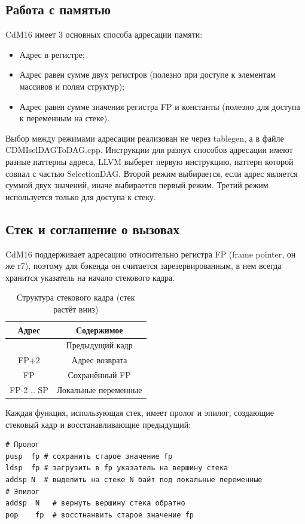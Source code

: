 \documentclass[a4paper,14pt]{extarticle}
\begin{document}
\subsection{Работа с памятью}
CdM16 имеет 3 основных способа адресации памяти:
\begin{itemize}
	\item Адрес в регистре;
	\item Адрес равен сумме двух регистров (полезно при доступе к элементам массивов и полям структур);
	\item Адрес равен сумме значения регистра FP и константы (полезно для доступа к переменным на стеке).
\end{itemize}

Выбор между режимами адресации реализован не через tablegen, а в файле CDMIselDAGToDAG.cpp. Инструкции для разнух способов адресации имеют разные паттерны адреса, LLVM выберет первую инструкцию, паттерн которой совпал с частью SelectionDAG. Второй режим выбирается, если адрес является суммой двух значений, иначе выбирается первый режим. Третий режим используется только для доступа к стеку.

\subsection{Стек и соглашение о вызовах}
CdM16 поддерживает адресацию относительно регистра FP (frame pointer, он же r7), поэтому для бэкенда он считается зарезервированным, в нем всегда хранится указатель на начало стекового кадра.
\begin{table}[!h]
	\begin{center}
		\begin{tabular}{ |c|c| }
			\hline
			Адрес & Содержимое \\
			\hline
			 & Предыдущий кадр \\
			 FP+2 & Адрес возврата \\
			 FP & Сохранённый FP \\
			 FP-2 .. SP & Локальные переменные \\
			 \hline
		\end{tabular}
		\caption{Структура стекового кадра (стек растёт вниз)}
	\end{center}
\end{table}

Каждая функция, использующая стек, имеет пролог и эпилог, создающие стековый кадр и восстанавливающие предыдущий:
\begin{verbatim}
# Пролог
pusр  fp # сохранить старое значение fp
ldsp  fp # загрузить в fp указатель на вершину стека
addsp N  # выделить на стеке N байт под локальные переменные
# Эпилог
addsp  N   # вернуть вершину стека обратно
pop    fp  # восстнанвить старое значение fp
\end{verbatim}
\end{document}
